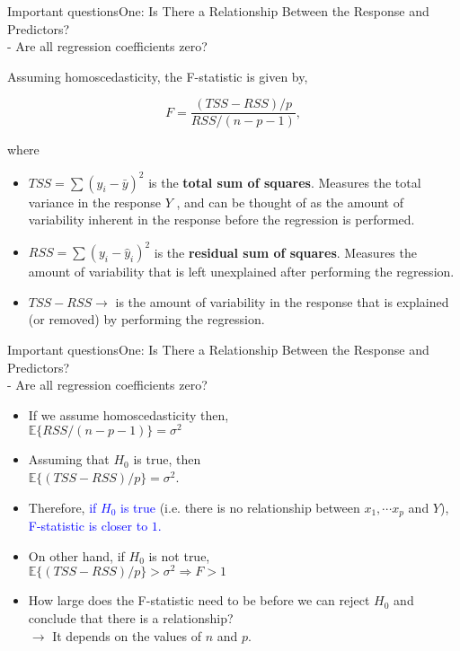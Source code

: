 \begin{frame}{Important questions}{One: Is There a Relationship Between the Response and Predictors? \\ - Are all regression coefficients zero? }

Assuming homoscedasticity, the F-statistic is given by, 

$$F = \frac{ (TSS - RSS)/p   }{RSS/(n-p-1)},$$

where \pause

\begin{itemize}
    \item $TSS = \sum(y_i - \bar{y})^2$ is the \textbf{total sum of squares}. Measures the total variance in the response $Y$ , and can be thought of as the amount of variability inherent in the response before the regression is performed. \pause
    \item $RSS = \sum(y_i - \hat{y}_i)^2$ is the \textbf{residual sum of squares}. Measures the amount of variability that is left unexplained after performing the regression. \pause
    \item $TSS - RSS \rightarrow$ is the amount of variability in the response that is explained (or removed) by performing the regression. \pause

\end{itemize}

\end{frame}

\begin{frame}{Important questions}{One: Is There a Relationship Between the Response and Predictors? \\ - Are all regression coefficients zero? }

\begin{itemize}
    \item If we assume homoscedasticity then, \\ $\mathbb{E} \{  RSS / (n-p-1)  \} = \sigma^2$  \pause 
    \item Assuming that $H_0$ is true, then \\ $\mathbb{E} \{  (TSS - RSS) / p  \} = \sigma^2$.  \pause 

    \item Therefore, \textcolor{blue}{if $H_0$ is true} (i.e. there is no relationship between $x_1, \cdots x_p$ and $Y$), \textcolor{blue}{F-statistic is closer to $1$.} \pause

    \item On other hand, if $H_0$ is not true, \\
    $\mathbb{E} \{  (TSS - RSS) / p  \} > \sigma^2 \Rightarrow F > 1$ \pause

    \item How large does the F-statistic need to be before we can reject $H_0$ and conclude that there is a relationship? \pause \\ 
    $\rightarrow$ It depends on the values of $n$ and $p$. 
 
\end{itemize}
    
\end{frame}


